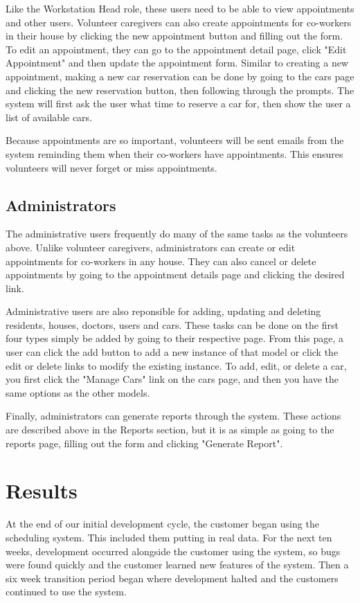 \documentclass{sig-alternate}
\begin{document}
Like the Workstation Head role, these users need to be able to view appointments and other users. Volunteer caregivers can also create appointments for co-workers in their house by clicking the new appointment button and filling out the form. To edit an appointment, they can go to the appointment detail page, click "Edit Appointment" and then update the appointment form. Similar to creating a new appointment, making a new car reservation can be done by going to the cars page and clicking the new reservation button, then following through the prompts. The system will first ask the user what time to reserve a car for, then show the user a list of available cars.

Because appointments are so important, volunteers will be sent emails from the system reminding them when their co-workers have appointments. This ensures volunteers will never forget or miss appointments.

\subsection{Administrators}
The administrative users frequently do many of the same tasks as the volunteers above. Unlike volunteer caregivers, administrators can create or edit appointments for co-workers in any house. They can also cancel or delete appointments by going to the appointment details page and clicking the desired link.

Administrative users are also reponsible for adding, updating and deleting residents, houses, doctors, users and cars. These tasks can be done on the first four types simply be added by going to their respective page. From this page, a user can click the add button to add a new instance of that model or click the edit or delete links to modify the existing instance. To add, edit, or delete a car, you first click the "Manage Cars" link on the cars page, and then you have the same options as the other models.

Finally, administrators can generate reports through the system. These actions are described above in the Reports section, but it is as simple as going to the reports page, filling out the form and clicking "Generate Report".

\section{Results}
At the end of our initial development cycle, the customer began using the scheduling system. This included them putting in real data. For the next ten weeks, development occurred alongside the customer using the system, so bugs were found quickly and the customer learned new features of the system. Then a six week transition period began where development halted and the customers continued to use the system.
\end{document}
